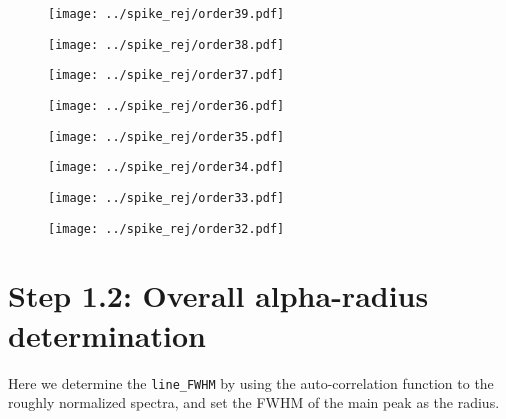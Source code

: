 \documentclass{article}
\begin{document}
\begin{figure}[H]
    \centering
    \texttt{[image: ../spike\_rej/order39.pdf]}
\end{figure}
\begin{figure}[H]
    \centering
    \texttt{[image: ../spike\_rej/order38.pdf]}
\end{figure}
\begin{figure}[H]
    \centering
    \texttt{[image: ../spike\_rej/order37.pdf]}
\end{figure}
\begin{figure}[H]
    \centering
    \texttt{[image: ../spike\_rej/order36.pdf]}
\end{figure}
\begin{figure}[H]
    \centering
    \texttt{[image: ../spike\_rej/order35.pdf]}
\end{figure}
\begin{figure}[H]
    \centering
    \texttt{[image: ../spike\_rej/order34.pdf]}
\end{figure}
\begin{figure}[H]
    \centering
    \texttt{[image: ../spike\_rej/order33.pdf]}
\end{figure}
\begin{figure}[H]
    \centering
    \texttt{[image: ../spike\_rej/order32.pdf]}
\end{figure}

\newpage

\section{Step 1.2: Overall alpha-radius determination}

Here we determine the \texttt{line\_FWHM} by using the auto-correlation function to the roughly normalized spectra, and set the FWHM of the main peak as the radius.
\end{document}
